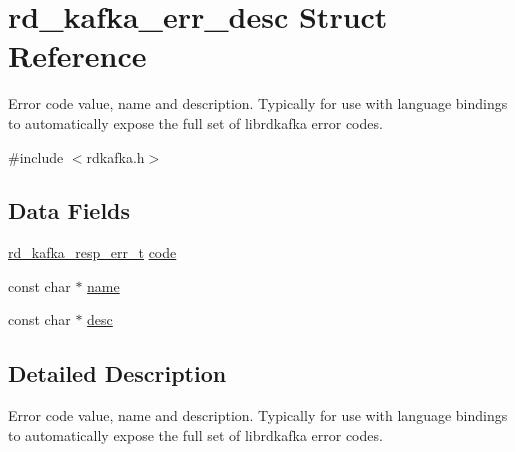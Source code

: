 \hypertarget{structrd__kafka__err__desc}{
\section{rd\_\-kafka\_\-err\_\-desc Struct Reference}
\label{structrd__kafka__err__desc}
}


Error code value, name and description. Typically for use with language bindings to automatically expose the full set of librdkafka error codes.  


{\ttfamily \#include $<$rdkafka.h$>$}\subsection*{Data Fields}
\begin{DoxyCompactItemize}
\item 
\hyperlink{rdkafka_8h_a03509bab51072c72a8dcf52337e6d5cb}{rd\_\-kafka\_\-resp\_\-err\_\-t} \hyperlink{structrd__kafka__err__desc_adce96ff60ac79c27f8bf1e2ccc61f9ba}{code}
\item 
const char $\ast$ \hyperlink{structrd__kafka__err__desc_a7b8578b7835261b1f27611f18d8a3477}{name}
\item 
const char $\ast$ \hyperlink{structrd__kafka__err__desc_ae5c84defa6e5df1f9fba870402b4eb85}{desc}
\end{DoxyCompactItemize}


\subsection{Detailed Description}
Error code value, name and description. Typically for use with language bindings to automatically expose the full set of librdkafka error codes. 

